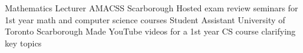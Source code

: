 \begin{cvhonors}
  \cvhonor
    {Mathematics Lecturer}
    {AMACSS}
    {Scarborough}
    {}
    {Hosted exam review seminars for 1st year math and computer science courses}
  \cvhonor
    {Student Assistant}
    {University of Toronto}
    {Scarborough}
    {}
    {Made YouTube videos for a 1st year CS course clarifying key topics}
\end{cvhonors}